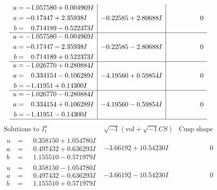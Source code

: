 \documentclass[1p]{elsarticle_modified}
\theoremstyle{definition}
\newcommand{\I}{\sqrt{-1}}
\begin{document}
$$\begin{array}{c|c|c}
\begin{aligned}
u &= -1.057580 + 0.004969 I \\
a &= -0.17447 + 2.35938 I \\
b &= \phantom{-}0.714189 - 0.522373 I\end{aligned}
 & -0.22585 + 2.80688 I & \phantom{-0.000000 } 0 \\ \hline\begin{aligned}
u &= -1.057580 - 0.004969 I \\
a &= -0.17447 - 2.35938 I \\
b &= \phantom{-}0.714189 + 0.522373 I\end{aligned}
 & -0.22585 - 2.80688 I & \phantom{-0.000000 } 0 \\ \hline\begin{aligned}
u &= -1.026770 + 0.280884 I \\
a &= \phantom{-}0.334154 - 0.106289 I \\
b &= -1.41951 + 0.14300 I\end{aligned}
 & -4.19560 + 0.59854 I & \phantom{-0.000000 } 0 \\ \hline\begin{aligned}
u &= -1.026770 - 0.280884 I \\
a &= \phantom{-}0.334154 + 0.106289 I \\
b &= -1.41951 - 0.14300 I\end{aligned}
 & -4.19560 - 0.59854 I & \phantom{-0.000000 } 0\\
 \hline 
 \end{array}$$\newpage$$\begin{array}{c|c|c}  
\text{Solutions to }I^u_{1}& \I (\text{vol} + \sqrt{-1}CS) & \text{Cusp shape}\\
 \hline 
\begin{aligned}
u &= \phantom{-}0.358150 + 1.054780 I \\
a &= \phantom{-}0.497432 + 0.636293 I \\
b &= \phantom{-}1.155510 - 0.571979 I\end{aligned}
 & -3.66192 + 10.54230 I & \phantom{-0.000000 } 0 \\ \hline\begin{aligned}
u &= \phantom{-}0.358150 - 1.054780 I \\
a &= \phantom{-}0.497432 - 0.636293 I \\
b &= \phantom{-}1.155510 + 0.571979 I\end{aligned}
 & -3.66192 - 10.54230 I & \phantom{-0.000000 } 0 \\ \hline\begin{aligned}

\end{aligned}
\end{array}$$
\end{document}
